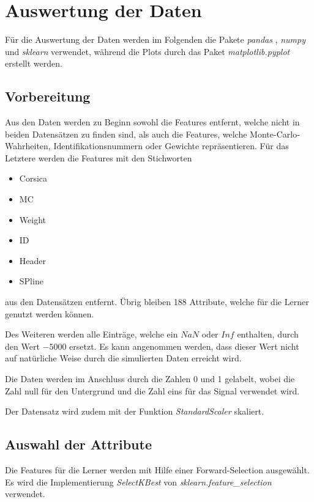 \section{Auswertung der Daten}
Für die Auswertung der Daten werden im Folgenden die Pakete \textit{pandas} \cite{pandas}, \textit{numpy} \cite{numpy} und \textit{sklearn} \cite{sklearn} verwendet, während die Plots durch das Paket \textit{matplotlib.pyplot} \cite{matplotlib} erstellt werden.

\subsection{Vorbereitung}
Aus den Daten werden zu Beginn sowohl die Features entfernt, welche nicht in beiden Datensätzen zu finden sind, als auch die Features, welche Monte-Carlo-Wahrheiten, Identifikationsnummern oder Gewichte repräsentieren. Für das Letztere werden die Features mit den Stichworten
\begin{itemize}
    \item Corsica
    \item MC
    \item Weight
    \item ID
    \item Header
    \item SPline
\end{itemize}
aus den Datensätzen entfernt. Übrig bleiben 188 Attribute, welche für die Lerner genutzt werden können.

Des Weiteren werden alle Einträge, welche ein $NaN$ oder $Inf$ enthalten, durch den Wert $-5000$ ersetzt. Es kann angenommen werden, dass dieser Wert nicht auf natürliche Weise durch die simulierten Daten erreicht wird.

Die Daten werden im Anschluss durch die Zahlen 0 und 1 gelabelt, wobei die Zahl null für den Untergrund und die Zahl eins für das Signal verwendet wird.

Der Datensatz wird zudem mit der Funktion \textit{StandardScaler} skaliert.

\subsection{Auswahl der Attribute}
Die Features für die Lerner werden mit Hilfe einer Forward-Selection ausgewählt. Es wird die Implementierung \textit{SelectKBest} von \textit{sklearn.feature\_selection} verwendet. 

